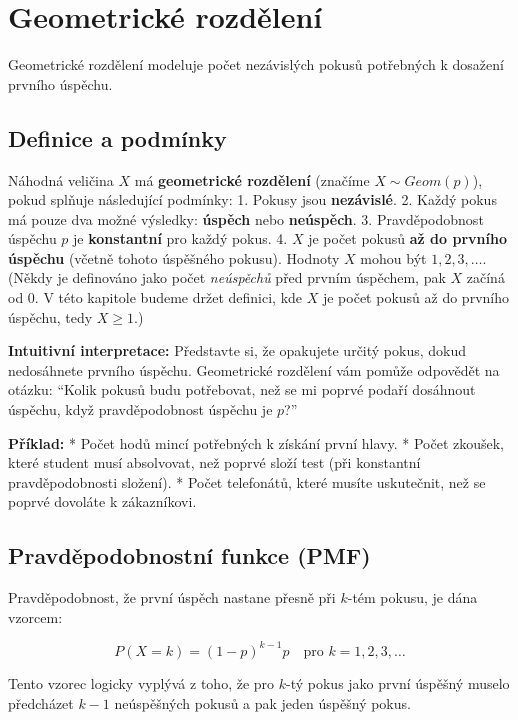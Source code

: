 \documentclass[
  czech,
  11pt,
  letterpaper,
  DIV=11,
  numbers=noendperiod]{scrreprt}
\begin{document}
\section{Geometrické rozdělení}\label{geometrickuxe9-rozdux11blenuxed}

Geometrické rozdělení modeluje počet nezávislých pokusů potřebných k
dosažení prvního úspěchu.

\subsection{Definice a podmínky}\label{definice-a-podmuxednky-2}

Náhodná veličina \(X\) má {\textbf{geometrické rozdělení}} (značíme
\(X \sim Geom(p)\)), pokud splňuje následující podmínky: 1. Pokusy jsou
\textbf{nezávislé}. 2. Každý pokus má pouze dva možné výsledky:
\textbf{úspěch} nebo \textbf{neúspěch}. 3. Pravděpodobnost úspěchu \(p\)
je \textbf{konstantní} pro každý pokus. 4. \(X\) je počet pokusů
\textbf{až do prvního úspěchu} (včetně tohoto úspěšného pokusu). Hodnoty
\(X\) mohou být \(1, 2, 3, \dots\). (Někdy je definováno jako počet
\emph{neúspěchů} před prvním úspěchem, pak \(X\) začíná od 0. V této
kapitole budeme držet definici, kde \(X\) je počet pokusů až do prvního
úspěchu, tedy \(X \ge 1\).)

\textbf{Intuitivní interpretace:} Představte si, že opakujete určitý
pokus, dokud nedosáhnete prvního úspěchu. Geometrické rozdělení vám
pomůže odpovědět na otázku: ``Kolik pokusů budu potřebovat, než se mi
poprvé podaří dosáhnout úspěchu, když pravděpodobnost úspěchu je
\(p\)?''

\textbf{Příklad:} * Počet hodů mincí potřebných k získání první hlavy. *
Počet zkoušek, které student musí absolvovat, než poprvé složí test (při
konstantní pravděpodobnosti složení). * Počet telefonátů, které musíte
uskutečnit, než se poprvé dovoláte k zákazníkovi.

\subsection{Pravděpodobnostní funkce
(PMF)}\label{pravdux11bpodobnostnuxed-funkce-pmf-3}

Pravděpodobnost, že první úspěch nastane přesně při \(k\)-tém pokusu, je
dána vzorcem:

\[ P(X=k) = (1-p)^{k-1} p \quad \text{pro } k=1, 2, 3, \dots \]

Tento vzorec logicky vyplývá z toho, že pro \(k\)-tý pokus jako první
úspěšný muselo předcházet \(k-1\) neúspěšných pokusů a pak jeden úspěšný
pokus.
\end{document}
